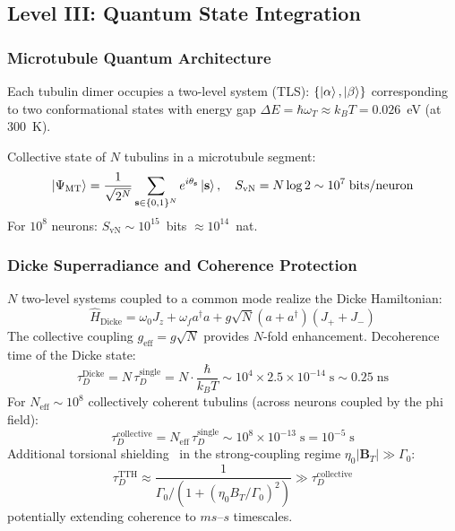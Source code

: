 \documentclass[12pt,a4paper]{article}
\newcommand{\SvN}{S_{\mathrm{vN}}}
\newcommand{\BT}{\mathbf{B}_T}
\newcommand{\HatH}{\hat{H}}
\numberwithin{equation}{section}
\begin{document}
\subsection{Level III: Quantum State Integration}

\subsubsection{Microtubule Quantum Architecture}

Each tubulin dimer occupies a two-level system (TLS):
$\{\Ket\alpha, \Ket\beta\}$ corresponding to two conformational states
with energy gap $\Delta E = \hbar\omega_T \approx k_BT = 0.026$~eV (at 300~K).

Collective state of $N$ tubulins in a microtubule segment:
\begin{equation}
  \Ket{\Psi_{\mathrm{MT}}} = \frac{1}{\sqrt{2^N}}
  \sum_{\mathbf{s}\in\{0,1\}^N} e^{i\theta_{\mathbf{s}}}\Ket{\mathbf{s}},
  \quad \SvN = N\log 2 \sim 10^7\;\mathrm{bits/neuron}
  \label{eq:MT_state}
\end{equation}
For $10^8$ neurons: $\SvN \sim 10^{15}$~bits $\approx 10^{14}$~nat.

\subsubsection{Dicke Superradiance and Coherence Protection}

$N$ two-level systems coupled to a common mode realize the Dicke Hamiltonian:
\begin{equation}
  \HatH_{\mathrm{Dicke}} = \omega_0 J_z + \omega_f a^\dagger a
  + g\sqrt{N}(a + a^\dagger)(J_+ + J_-)
  \label{eq:Dicke}
\end{equation}
The collective coupling $g_{\mathrm{eff}} = g\sqrt{N}$ provides
$N$-fold enhancement. Decoherence time of the Dicke state:
\begin{equation}
  \tau_D^{\mathrm{Dicke}} = N\,\tau_D^{\mathrm{single}}
  = N\cdot\frac{\hbar}{k_BT}
  \sim 10^4 \times 2.5\times10^{-14}\;\mathrm{s} \sim 0.25\;\mathrm{ns}
  \label{eq:Dicke_tau}
\end{equation}
For $N_{\mathrm{eff}} \sim 10^8$ collectively coherent tubulins (across neurons
coupled by the phi field):
\begin{equation}
  \tau_D^{\mathrm{collective}} = N_{\mathrm{eff}}\,\tau_D^{\mathrm{single}}
  \sim 10^8\times10^{-13}\;\mathrm{s} = 10^{-5}\;\mathrm{s}
  \label{eq:collective_tau}
\end{equation}
Additional torsional shielding~\citep{Calmels2026a} in the strong-coupling
regime $\eta_0|\BT| \gg \Gamma_0$:
\begin{equation}
  \tau_D^{\mathrm{TTH}} \approx \frac{1}{\Gamma_0/(1+(\eta_0 B_T/\Gamma_0)^2)}
  \gg \tau_D^{\mathrm{collective}}
  \label{eq:TTH_tau}
\end{equation}
potentially extending coherence to $ms$--$s$ timescales.
\end{document}

